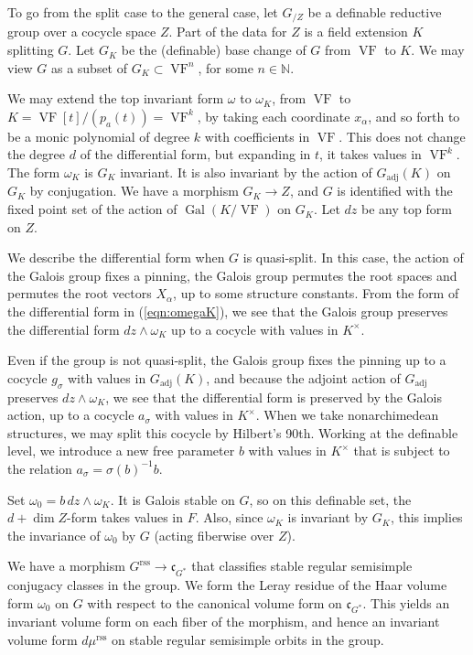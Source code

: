 \documentclass[12pt]{amsart}
\newcommand{\op}[1]{\operatorname{#1}}
\newcommand{\ring}[1]{{\mathbb #1}}
\def\VF{{\op{VF}}}
\newcommand{\fc}{\mathfrak{c}}
\newcommand{\reg}{\mathrm{rss}}
\theoremstyle{plain}
\theoremstyle{definition}
\begin{document}
To go from the split case to the general case, 
let $G_{/Z}$ be a definable reductive group over a cocycle space $Z$.
Part of the data
for $Z$ is a field extension $K$ splitting $G$.  Let $G_K$
be the (definable) base change of $G$ from $\VF$ to $K$. We may view
$G$ as a subset of $G_K\subset \VF^{n}$, for some
$n\in\ring{N}$.

We may extend the top invariant form $\omega$ to $\omega_K$, from
$\VF$ to $K = \VF[t]/(p_a(t)) = \VF^k$, by taking each coordinate
$x_\alpha$, and so forth to be a monic polynomial of degree $k$ with
coefficients in $\VF$.  This does not change the degree $d$ of the
differential form, but expanding in $t$, it takes values in $\VF^k$.
The form $\omega_K$ is $G_K$ invariant.  It is also invariant by the
action of $G_{\op{adj}}(K)$ on $G_K$ by conjugation.  We have a
morphism $G_K\to Z$, and $G$ is identified with the fixed point set of
the action of $\op{Gal}(K/\VF)$ on $G_K$.  Let $dz$ be any top form on
$Z$.

We describe the differential form when $G$ is quasi-split.  In this
case, the action of the Galois group fixes a pinning, the Galois group
permutes the root spaces and permutes the root vectors $X_\alpha$, up
to some structure constants.  From the form of the differential form
in (\ref{eqn:omegaK}), we see that the Galois group preserves the
differential form $dz\land \omega_K$ up to a cocycle with values in
$K^\times$.

Even if the group is not quasi-split, the Galois group fixes the
pinning up to a cocycle $g_\sigma$ with values in $G_{\op{adj}}(K)$,
and because the adjoint action of $G_{\op{adj}}$ preserves
$dz\land \omega_K$, we see that the differential form is preserved by
the Galois action, up to a cocycle $a_\sigma$ with values in
$K^\times$.  When we take nonarchimedean structures, we may split this
cocycle by Hilbert's 90th.  Working at the definable level, we
introduce a new free parameter $b$ with values in $K^\times$ that is
subject to the relation $a_\sigma = \sigma(b)^{-1} b$.

Set $\omega_0 = b\, dz\land\omega_K$.  It is Galois stable on
$G$, so on this definable set, the $d+\dim Z$-form takes values in $F$.
Also, since $\omega_K$ is invariant by $G_K$, this implies the
invariance of $\omega_0$ by $G$ (acting fiberwise over $Z$).  

We have a morphism $G^\reg\to \fc_{G^*}$ that classifies stable
regular semisimple conjugacy classes in the group.  We form the Leray
residue of the Haar volume form $\omega_0$ on $G$ with respect to the
canonical volume form on $\fc_{G^*}$.  This yields an invariant volume
form on each fiber of the morphism, and hence an invariant volume form
$d\mu^\reg$ on stable regular semisimple orbits in the group.
\end{document}
